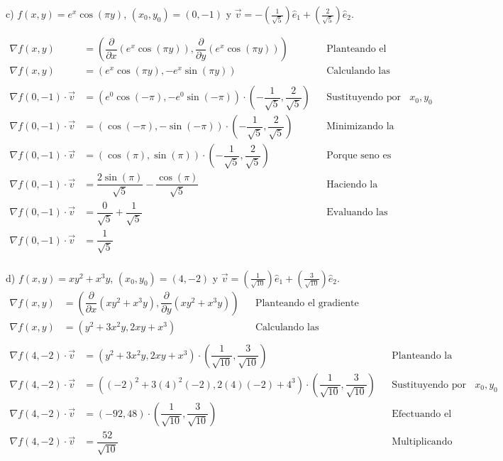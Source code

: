 \documentclass[letterpaper]{article}
\renewcommand{\d}{\partial}
\renewcommand{\*}{\cdot}
\theoremstyle{definition}
\begin{document}
c) $f(x,y) = e^x\cos{(\pi y)}$, $(x_0, y_0) = (0,-1)$ y $\vec{v} = - \left( \frac{1}{\sqrt{5}} \right)\hat{e}_1 +  \left( \frac{2}{\sqrt{5}} \right)\hat{e}_2 $.

\begin{align*}
	\nabla f(x,y) &= \left( \dfrac{\d}{\d x} (e^x\cos{(\pi y)}), \dfrac{\d}{\d y}(e^x\cos{(\pi y)}) \right) && \text{Planteando el gradiente}\\
	\nabla f(x,y) &= \left( e^x\cos(\pi y), -e^x\sin(\pi y) \right) && \text{Calculando las derivadas parciales}\\
	\\	
	\nabla f(0,-1) \* \vec{v} &= \left( e^0\cos(-\pi ), -e^0\sin(-\pi ) \right) \* \left(-\dfrac{1}{\sqrt{5}}, \dfrac{2}{\sqrt{5}} \right) && \text{Sustituyendo por los valores de } x_0, y_0\\
	\nabla f(0,-1) \* \vec{v} &= \left( \cos(-\pi ), -\sin(-\pi ) \right) \* \left(-\dfrac{1}{\sqrt{5}}, \dfrac{2}{\sqrt{5}} \right) && \text{Minimizando la expresión}\\
	\nabla f(0,-1) \* \vec{v} &= \left( \cos(\pi ), \sin(\pi ) \right) \* \left(-\dfrac{1}{\sqrt{5}}, \dfrac{2}{\sqrt{5}} \right) && \text{Porque seno es impar y coseno par }\\
	\nabla f(0,-1) \* \vec{v} &= \dfrac{2\sin(\pi)}{\sqrt{5}} - \dfrac{\cos(\pi)}{\sqrt{5}} && \text{Haciendo la multiplicación }\\
	\nabla f(0,-1) \* \vec{v} &= \dfrac{0}{\sqrt{5}} + \dfrac{1}{\sqrt{5}} && \text{Evaluando las trigonométricas }\\
	\nabla f(0,-1) \* \vec{v} &=  \dfrac{1}{\sqrt{5}} && \text{ }\\
\end{align*}

d) $f(x,y) = xy^2 + x^3y$, $(x_0, y_0) = (4,-2)$ y $\vec{v} =  \left( \frac{1}{\sqrt{10}} \right)\hat{e}_1 +  \left( \frac{3}{\sqrt{10}} \right)\hat{e}_2 $.
\begin{align*}
	\nabla f(x,y) &= \left( \dfrac{\d}{\d x} (xy^2 + x^3y), \dfrac{\d}{\d y}(xy^2 + x^3y) \right) && \text{Planteando el gradiente}\\
	\nabla f(x,y) &= \left( y^2 + 3x^2y ,2xy + x^3 \right) && \text{Calculando las derivadas parciales}\\
\end{align*}
\begin{align*}
	\nabla f(4,-2) \* \vec{v} &= \left(y^2 + 3x^2y ,2xy + x^3 \right) \* \left(\dfrac{1}{\sqrt{10}}, \dfrac{3}{\sqrt{10}} \right) && \text{Planteando la derivada direccional } \\
	\nabla f(4,-2) \* \vec{v} &= \left((-2)^2 + 3(4)^2(-2) ,2(4)(-2) + 4^3 \right) \* \left(\dfrac{1}{\sqrt{10}}, \dfrac{3}{\sqrt{10}} \right) && \text{Sustituyendo por los valores de } x_0, y_0\\
	\nabla f(4,-2) \* \vec{v} &= \left(-92,48 \right) \* \left(\dfrac{1}{\sqrt{10}}, \dfrac{3}{\sqrt{10}} \right) && \text{Efectuando el cálculo} \\
	\nabla f(4,-2) \* \vec{v} &= \dfrac{52}{\sqrt{10}} && \text{Multiplicando entrada a entrada} \\
\end{align*}
\end{document}
